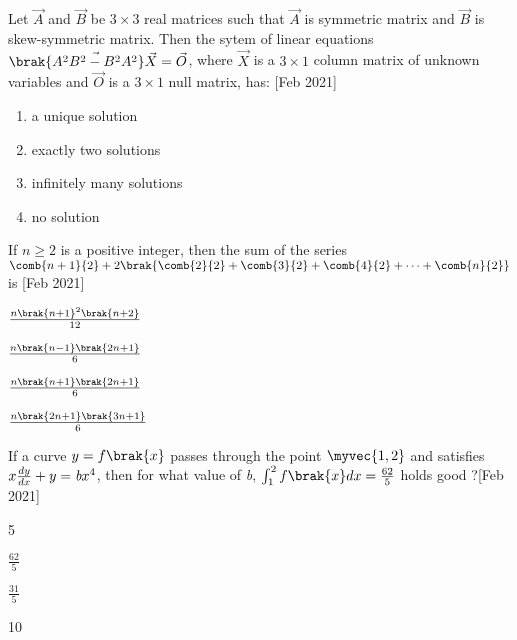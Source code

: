 \iffalse
\title{2021}
\author{EE24BTECH11012}
\section{mcq-single}
\fi

	\item Let $\vec{A}$ and $\vec{B}$ be $3 \times 3$ real matrices such that $\vec{A}$ is symmetric matrix and $\vec{B}$ is skew-symmetric matrix. Then the sytem of linear equations $\brak{\vec{A^2B^2 - B^2A^2}}\vec{X} = \vec{O}$, where $\vec{X}$ is a $3 \times 1$ column matrix of unknown variables and $\vec{O}$ is a $3 \times 1$ null matrix, has: \hfill{[Feb 2021]} 
		\begin{enumerate}
			\item a unique solution
			\item exactly two solutions
			\item infinitely many solutions
			\item no solution
		\end{enumerate}
	\item If $ n\geq2 $ is a positive integer, then the sum of the series $\comb{n+1}{2} + 2\brak{\comb{2}{2} + \comb{3}{2} + \comb{4}{2} + \dots + \comb{n}{2}}$ is \hfill{[Feb 2021]}
		\begin{enumerate}
		\end{enumerate}
	\item If a curve $ y = f\brak{x} $ passes through the point $\myvec{1,2}$ and satisfies $ x\frac{dy}{dx} + y = \emph{b}x^4 $, then for what value of \emph{b}, $ \int_{1}^{2} f\brak{x} dx = \frac{62}{5} $ holds good ?\hfill{[Feb 2021]}
		\begin{enumerate}
				\begin{multicols}{4}
			\item 5
			\item $\frac{62}{5}$
			\item $\frac{31}{5}$
			\item 10
				\end{multicols}
		\end{enumerate}

